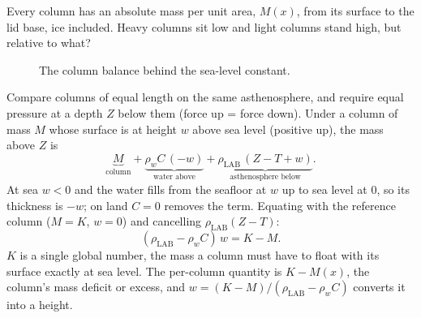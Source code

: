 Every column has an absolute mass per unit area, $M(x)$, from its surface to the lid base, ice included.
Heavy columns sit low and light columns stand high, but relative to what?

\begin{figure}[h]
\centering
{}
\caption{The column balance behind the sea-level constant.}
\end{figure}

Compare columns of equal length on the same asthenosphere, and require equal pressure at a depth $Z$ below them (force up = force down).
Under a column of mass $M$ whose surface is at height $w$ above sea level (positive up), the mass above $Z$ is
\[
    \underbrace{M}_{\text{column}} + \underbrace{\rho_w C\,(-w)}_{\text{water above}} + \underbrace{\rho_{\mathrm{LAB}}\,(Z - T + w)}_{\text{asthenosphere below}} .
\]
At sea $w<0$ and the water fills from the seafloor at $w$ up to sea level at 0, so its thickness is $-w$; on land $C=0$ removes the term.
Equating with the reference column ($M = K$, $w = 0$) and cancelling $\rho_{\mathrm{LAB}}(Z-T)$:
\begin{equation}
    (\rho_{\mathrm{LAB}}-\rho_w C)\,w = K - M .
\end{equation}
$K$ is a single global number, the mass a column must have to float with its surface exactly at sea level.
The per-column quantity is $K - M(x)$, the column's mass deficit or excess, and $w = (K-M)/(\rho_{\mathrm{LAB}}-\rho_w C)$ converts it into a height.


